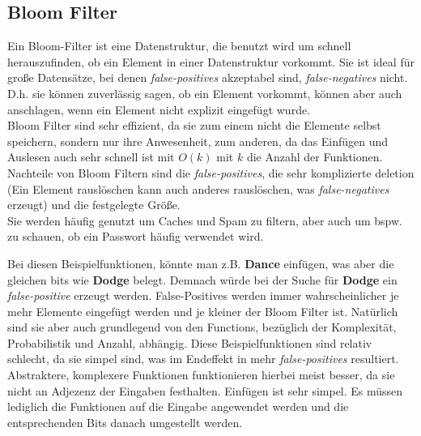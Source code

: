 \documentclass[
../../AuD-Zusammenfassung.tex,
]
{subfiles}
\begin{document}
\newpage
\subsection{Bloom Filter}
Ein Bloom-Filter ist eine Datenstruktur, die benutzt wird um schnell herauszufinden, ob ein Element in einer Datenstruktur vorkommt. Sie ist ideal für große Datensätze, bei denen \textit{false-positives} akzeptabel sind, \textit{false-negatives} nicht. D.h. sie können zuverlässig sagen, ob ein Element vorkommt, können aber auch anschlagen, wenn ein Element nicht explizit eingefügt wurde. \\
Bloom Filter sind sehr effizient, da sie zum einem nicht die Elemente selbst speichern, sondern nur ihre Anwesenheit, zum anderen, da das Einfügen und Auslesen auch sehr schnell ist mit $O(k)$ mit $k$ die Anzahl der Funktionen.\\
Nachteile von Bloom Filtern sind die \textit{false-positives}, die sehr komplizierte deletion (Ein Element rauslöschen kann auch anderes rauslöschen, was \textit{false-negatives} erzeugt) und die festgelegte Größe. \\
Sie werden häufig genutzt um Caches und Spam zu filtern, aber auch um bspw. zu schauen, ob ein Passwort häufig verwendet wird.

Bei diesen Beispielfunktionen, könnte man z.B. \textbf{Dance} einfügen, was aber die gleichen bits wie \textbf{Dodge} belegt. Demnach würde bei der Suche für \textbf{Dodge} ein \textit{false-positive} erzeugt werden. False-Positives werden immer wahrscheinlicher je mehr Elemente eingefügt werden und je kleiner der Bloom Filter ist. Natürlich sind sie aber auch grundlegend von den Functions, bezüglich der Komplexität, Probabilistik und Anzahl, abhängig. Diese Beispielfunktionen sind relativ schlecht, da sie simpel sind, was im Endeffekt in mehr \textit{false-positives} resultiert. Abstraktere, komplexere Funktionen funktionieren hierbei meist besser, da sie nicht an Adjezenz der Eingaben festhalten.
\newpage
Einfügen ist sehr simpel. Es müssen lediglich die Funktionen auf die Eingabe angewendet werden und die entsprechenden Bits danach umgestellt werden.

\begin{minipage}[t]{\textwidth}
    \centering
\end{minipage}
\end{document}
